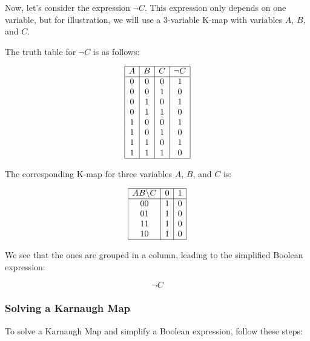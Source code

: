 Now, let's consider the expression \( \neg C \). This expression only 
depends on one variable, but for illustration, we will use a 
3-variable K-map with variables \( A \), \( B \), and \( C \).
\vspace{\baselineskip}

The truth table for \( \neg C \) is as follows:

\[
	\begin{array}{|c|c|c|c|}
		\hline
		A & B & C & \neg C \\
		\hline
		0 & 0 & 0 & 1      \\
		0 & 0 & 1 & 0      \\
		0 & 1 & 0 & 1      \\
		0 & 1 & 1 & 0      \\
		1 & 0 & 0 & 1      \\
		1 & 0 & 1 & 0      \\
		1 & 1 & 0 & 1      \\
		1 & 1 & 1 & 0      \\
		\hline
	\end{array}
\]

The corresponding K-map for three variables \( A \), \( B \), and \( C \) is:

\[
	\begin{array}{|c|c|c|c|}
		\hline
		AB \backslash C & 0 & 1 \\
		\hline
		00              & 1 & 0 \\
		01              & 1 & 0 \\
		11              & 1 & 0 \\
		10              & 1 & 0 \\
		\hline
	\end{array}
\]

We see that the ones are grouped in a column, leading to the simplified Boolean expression:

\[
	\neg C
\]

\subsubsection{Solving a Karnaugh Map}

To solve a Karnaugh Map and simplify a Boolean expression, follow these steps:

